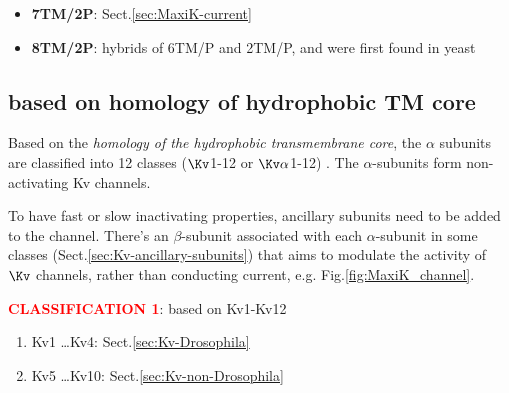 \begin{itemize}

  \item {\bf 7TM/2P}: Sect.\ref{sec:MaxiK-current}
  
  \item {\bf 8TM/2P}: hybrids of 6TM/P and 2TM/P, and were first found in yeast
\end{itemize}





\subsection{based on homology of hydrophobic TM core}
\label{sec:K+-channel-classification-TM-core}
\label{sec:nomenclature-K_channel-based-homology-TM-core}

Based on the {\it homology of the hydrophobic transmembrane core}, the $\alpha$
subunits are classified into 12 classes ($\Kv$1-12 or $\Kv\alpha$1-12)
\citep{choe2002pcs}.  The $\alpha$-subunits form non-activating Kv channels.

To have fast or slow inactivating properties, ancillary subunits need to be
added to the channel. There's an $\beta$-subunit associated with each
$\alpha$-subunit in some classes (Sect.\ref{sec:Kv-ancillary-subunits}) that
aims to modulate the activity of $\Kv$ channels, rather than conducting current,
e.g. Fig.\ref{fig:MaxiK_channel}.

\textcolor{red}{\bf CLASSIFICATION 1}: based on Kv1-Kv12
\begin{enumerate}

  \item Kv1 \ldots Kv4: Sect.\ref{sec:Kv-Drosophila}


 \item Kv5 \ldots Kv10: Sect.\ref{sec:Kv-non-Drosophila}
\end{enumerate}



